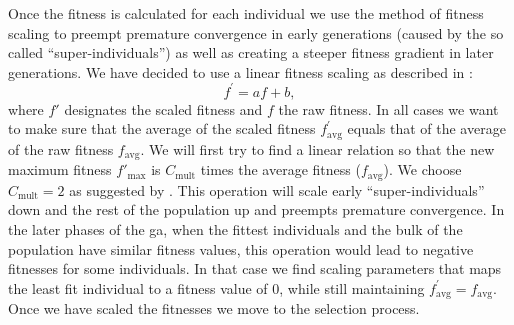 Once the fitness is calculated for each individual we use the method of fitness scaling to preempt premature convergence in early generations (caused by the so called ``super-individuals'') as well as creating a steeper fitness gradient in later generations. We have decided to use a linear fitness scaling as described in \citet{citeulike:125978}:
\[
f^\prime = af+b,
\]
where $f\prime$ designates the scaled fitness and $f$ the raw fitness.
In all cases we want to make sure that the average of the scaled fitness $f_\textrm{avg}^\prime$ equals that of the average of the raw fitness $f_\textrm{avg}$. We will first try to find a linear relation so that the new maximum fitness $f'_\textrm{max}$ is $C_\textrm{mult}$ times the average fitness ($f_\textrm{avg}$). We choose $C_\textrm{mult}=2$ as suggested by \citet{citeulike:125978}. This operation will scale early ``super-individuals'' down and the rest of the population up and preempts premature convergence. In the later phases of the \gls{ga}, when the fittest individuals and the bulk of the population have similar fitness values, this operation would lead to negative fitnesses for some individuals. In that case we find scaling parameters that maps the least fit individual to a fitness value of 0, while still maintaining $f_\textrm{avg}^\prime=f_\textrm{avg}$. Once we have scaled the fitnesses we move to the selection process.

